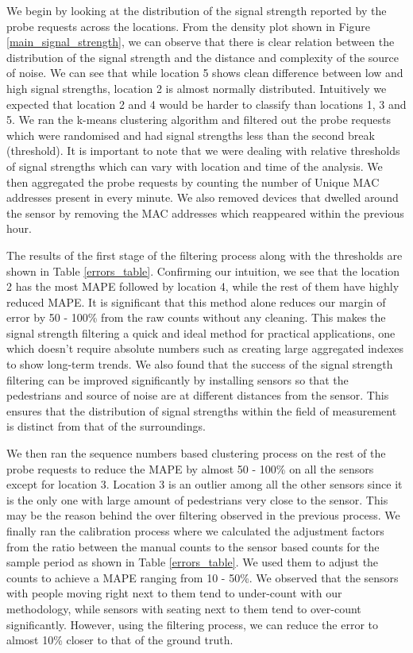 We begin by looking at the distribution of the signal strength reported by the
probe requests across the locations. From the density plot shown in Figure
\ref{main_signal_strength}, we can observe that there is clear relation between
the distribution of the signal strength and the distance and complexity of the
source of noise. We can see that while location 5 shows clean difference
between low and high signal strengths, location 2 is almost normally
distributed.  Intuitively we expected that location 2 and 4 would be harder to
classify than locations 1, 3 and 5.  We ran the k-means clustering algorithm
and filtered out the probe requests which were randomised and had signal
strengths less than the second break (threshold).  It is important to note that
we were dealing with relative thresholds of signal strengths which can vary
with location and time of the analysis.  We then aggregated the probe requests
by counting the number of Unique MAC addresses present in every minute. We also
removed devices that dwelled around the sensor by removing the MAC
addresses which reappeared within the previous hour.

The results of the first stage of the filtering process along with the
thresholds are shown in Table \ref{errors_table}.  Confirming our intuition, we
see that the location 2 has the most MAPE followed by location 4, while the rest
of them have highly reduced MAPE.  It is significant that this method alone
reduces our margin of error by 50 - 100\% from the raw counts without any
cleaning.  This makes the signal strength filtering a quick and ideal method for
practical applications, one which doesn't require absolute numbers such as
creating large aggregated indexes to show long-term trends.  We also found that
the success of the signal strength filtering can be improved significantly by
installing sensors so that the pedestrians and source of noise are at different
distances from the sensor. This ensures that the distribution of signal
strengths within the field of measurement is distinct from that of the
surroundings.

We then ran the sequence numbers based clustering process on the rest of the
probe requests to reduce the MAPE by almost 50 - 100\% on all the sensors except
for location 3.  Location 3 is an outlier among all the other sensors since it
is the only one with large amount of pedestrians very close to the sensor.  This
may be the reason behind the over filtering observed in the previous process.
We finally ran the calibration process where we calculated the adjustment
factors from the ratio between the manual counts to the sensor based counts for
the sample period as shown in Table \ref{errors_table}.  We used them to adjust
the counts to achieve a MAPE ranging from 10 - 50\%. We observed that the
sensors with people moving right next to them tend to under-count with our
methodology, while sensors with seating next to them tend to over-count
significantly. However, using the filtering process, we can reduce the error to
almost 10\% closer to that of the ground truth.

